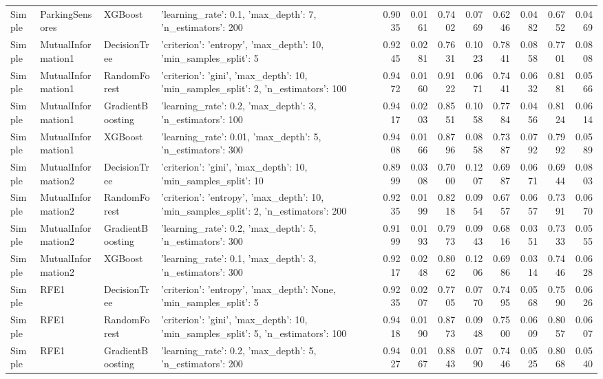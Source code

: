 \begin{tabular}{llllrrrrrrrr}
Simple & ParkingSensores & XGBoost & {'learning_rate': 0.1, 'max_depth': 7, 'n_estimators': 200} & 0.9035 & 0.0161 & 0.7402 & 0.0769 & 0.6246 & 0.0482 & 0.6752 & 0.0469 \\
Simple & MutualInformation1 & DecisionTree & {'criterion': 'entropy', 'max_depth': 10, 'min_samples_split': 5} & 0.9245 & 0.0281 & 0.7631 & 0.1023 & 0.7841 & 0.0858 & 0.7701 & 0.0808 \\
Simple & MutualInformation1 & RandomForest & {'criterion': 'gini', 'max_depth': 10, 'min_samples_split': 2, 'n_estimators': 100} & 0.9472 & 0.0160 & 0.9122 & 0.0671 & 0.7441 & 0.0632 & 0.8181 & 0.0566 \\
Simple & MutualInformation1 & GradientBoosting & {'learning_rate': 0.2, 'max_depth': 3, 'n_estimators': 100} & 0.9417 & 0.0203 & 0.8551 & 0.1058 & 0.7784 & 0.0456 & 0.8124 & 0.0614 \\
Simple & MutualInformation1 & XGBoost & {'learning_rate': 0.01, 'max_depth': 5, 'n_estimators': 300} & 0.9408 & 0.0166 & 0.8796 & 0.0858 & 0.7387 & 0.0792 & 0.7992 & 0.0589 \\
Simple & MutualInformation2 & DecisionTree & {'criterion': 'gini', 'max_depth': 10, 'min_samples_split': 10} & 0.8999 & 0.0308 & 0.7000 & 0.1207 & 0.6987 & 0.0671 & 0.6944 & 0.0803 \\
Simple & MutualInformation2 & RandomForest & {'criterion': 'entropy', 'max_depth': 10, 'min_samples_split': 2, 'n_estimators': 200} & 0.9235 & 0.0199 & 0.8218 & 0.0954 & 0.6757 & 0.0657 & 0.7391 & 0.0670 \\
Simple & MutualInformation2 & GradientBoosting & {'learning_rate': 0.2, 'max_depth': 5, 'n_estimators': 300} & 0.9199 & 0.0193 & 0.7973 & 0.0943 & 0.6816 & 0.0351 & 0.7333 & 0.0555 \\
Simple & MutualInformation2 & XGBoost & {'learning_rate': 0.1, 'max_depth': 3, 'n_estimators': 300} & 0.9217 & 0.0248 & 0.8062 & 0.1206 & 0.6986 & 0.0314 & 0.7446 & 0.0628 \\
Simple & RFE1 & DecisionTree & {'criterion': 'entropy', 'max_depth': None, 'min_samples_split': 5} & 0.9235 & 0.0207 & 0.7705 & 0.0770 & 0.7495 & 0.0568 & 0.7590 & 0.0626 \\
Simple & RFE1 & RandomForest & {'criterion': 'gini', 'max_depth': 10, 'min_samples_split': 5, 'n_estimators': 100} & 0.9418 & 0.0190 & 0.8773 & 0.0948 & 0.7500 & 0.0609 & 0.8057 & 0.0607 \\
Simple & RFE1 & GradientBoosting & {'learning_rate': 0.2, 'max_depth': 5, 'n_estimators': 200} & 0.9427 & 0.0167 & 0.8843 & 0.0790 & 0.7446 & 0.0525 & 0.8068 & 0.0540 \\

\end{tabular}
